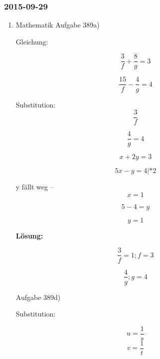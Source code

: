 \documentclass[11pt]{article}
\begin{document}
\subsubsection{2015-09-29}
\label{sec-1-2-7}
\begin{enumerate}
\item Mathematik
\label{sec-1-2-7-1}
Aufgabe 389a)

Gleichung:


\begin{equation}
\frac{3}{f} + \frac{8}{g} = 3
\end{equation}

\begin{equation}
\frac{15}{f} - \frac{4}{g} = 4
\end{equation}

Substitution:
\begin{equation}
\frac{3}{f}
\end{equation}

\begin{equation}
\frac{4}{g} = 4
\end{equation}






\begin{equation}
x + 2 y = 3
\end{equation}

\begin{equation}
5x - y = 4 | * 2
\end{equation}

y fällt weg
 --
\begin{equation}
x = 1
\end{equation}

\begin{equation}
5 -4 = y
\end{equation}

\begin{equation}
y = 1
\end{equation}

\textbf{Lösung:}

\begin{equation}
\frac{3}{f} = 1; f = 3
\end{equation}

\begin{equation}
\frac{4}{g}; g = 4
\end{equation}


Aufgabe 389d)

Substitution:

\begin{equation}
u = \frac{1}{s}
\end{equation}
\begin{equation}
v = \frac{1}{t}
\end{equation}


\end{enumerate}
\end{document}
